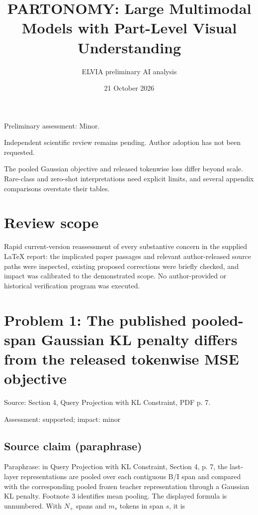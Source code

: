 \documentclass[11pt]{article}
\begin{document}
\title{PARTONOMY: Large Multimodal Models with Part-Level Visual Understanding}

\author{ELVIA preliminary AI analysis}\date{21 October 2026}\maketitle

Preliminary assessment: Minor.\par

Independent scientific review remains pending. Author adoption has not been requested.

The pooled Gaussian objective and released tokenwise loss differ beyond scale. Rare-class and zero-shot interpretations need explicit limits, and several appendix comparisons overstate their tables.

\section*{Review scope}

Rapid current-version reassessment of every substantive concern in the supplied LaTeX report: the implicated paper passages and relevant author-released source paths were inspected, existing proposed corrections were briefly checked, and impact was calibrated to the demonstrated scope. No author-provided or historical verification program was executed.

\section*{Problem 1: The published pooled-span Gaussian KL penalty differs from the released tokenwise MSE objective}

Source: Section 4, Query Projection with KL Constraint, PDF p. 7.

Assessment: supported; impact: minor

\subsection*{Source claim (paraphrase)}

Paraphrase: in Query Projection with KL Constraint, Section 4, p. 7, the last-layer representations are pooled over each contiguous B/I span and compared with the corresponding pooled frozen teacher representation through a Gaussian KL penalty. Footnote 3 identifies mean pooling. The displayed formula is unnumbered. With \(N_+\) spans and \(m_s\) tokens in span \(s\), it is
\end{document}
